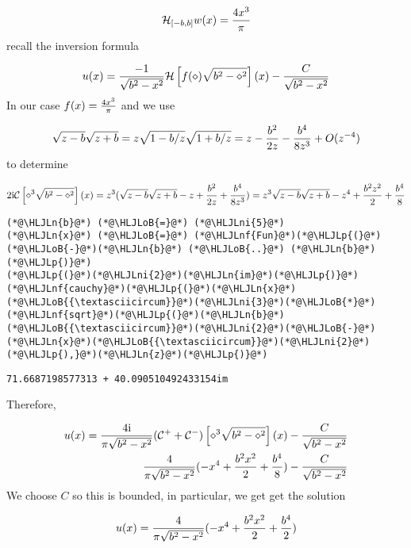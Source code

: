 \documentclass[12pt,a4paper]{article}
\newcommand{\HLJLn}[1]{#1}
\newcommand{\HLJLnf}[1]{\textcolor[RGB]{66,102,213}{#1}}
\newcommand{\HLJLni}[1]{\textcolor[RGB]{59,151,46}{#1}}
\newcommand{\HLJLoB}[1]{\textcolor[RGB]{102,102,102}{\textbf{#1}}}
\newcommand{\HLJLp}[1]{#1}
\def\I{ {\rm i} }
\def\CC{ {\cal C} }
\def\HH{ {\cal H} }
\begin{document}
\[
\HH_{[-b,b]} w(x) = {4 x^3 \over \pi}
\]
recall the inversion formula

\[
    u(x) =  {-1 \over \sqrt{b^2 - x^2}}\HH \left[{ f(\diamond)  \sqrt{b^2-\diamond^2} }\right](x)  - {C \over \sqrt{b^2-x^2}}
\]
In our case $f(x) = {4 x^3 \over \pi}$ and we use

\[
\sqrt{z-b}\sqrt{z+b} = z\sqrt{1-b/z}\sqrt{1+b/z} = z - {b^2 \over 2 z} -{b^4 \over 8z^3} + O(z^{-4})
\]
to determine

\[
2 \I \CC \left[{ \diamond^3  \sqrt{b^2-\diamond^2} }\right](x) =
z^3(\sqrt{z-b}\sqrt{z+b} -z +  {b^2 \over 2 z} + {b^4 \over 8z^3}) = z^3\sqrt{z-b}\sqrt{z+b} -z^4 +  {b^2z^2 \over 2} + {b^4 \over 8}
\]

\begin{lstlisting}
(*@\HLJLn{b}@*) (*@\HLJLoB{=}@*) (*@\HLJLni{5}@*)
(*@\HLJLn{x}@*) (*@\HLJLoB{=}@*) (*@\HLJLnf{Fun}@*)(*@\HLJLp{(}@*)(*@\HLJLoB{-}@*)(*@\HLJLn{b}@*) (*@\HLJLoB{..}@*) (*@\HLJLn{b}@*)(*@\HLJLp{)}@*)
(*@\HLJLp{(}@*)(*@\HLJLni{2}@*)(*@\HLJLn{im}@*)(*@\HLJLp{)}@*)(*@\HLJLnf{cauchy}@*)(*@\HLJLp{(}@*)(*@\HLJLn{x}@*)(*@\HLJLoB{{\textasciicircum}}@*)(*@\HLJLni{3}@*)(*@\HLJLoB{*}@*)(*@\HLJLnf{sqrt}@*)(*@\HLJLp{(}@*)(*@\HLJLn{b}@*)(*@\HLJLoB{{\textasciicircum}}@*)(*@\HLJLni{2}@*)(*@\HLJLoB{-}@*)(*@\HLJLn{x}@*)(*@\HLJLoB{{\textasciicircum}}@*)(*@\HLJLni{2}@*)(*@\HLJLp{),}@*)(*@\HLJLn{z}@*)(*@\HLJLp{)}@*)
\end{lstlisting}

\begin{lstlisting}
71.6687198577313 + 40.090510492433154im
\end{lstlisting}


Therefore,


\begin{align*}
u(x) = {4\I \over \pi \sqrt{b^2 - x^2}}(\CC^+ + \CC^-) \left[{ \diamond^3  \sqrt{b^2-\diamond^2} }\right](x)  - {C \over \sqrt{b^2-x^2}} \\
{4 \over \pi \sqrt{b^2 - x^2}}(-x^4+{b^2 x^2 \over 2} + {b^4 \over 8})- {C \over \sqrt{b^2-x^2}}
\end{align*}
We choose $C$ so this is bounded, in particular, we get get the solution

\[
u(x) = {4 \over \pi \sqrt{b^2 - x^2}}(-x^4+{b^2 x^2 \over 2} + {b^4 \over 2})
\]
\end{document}

